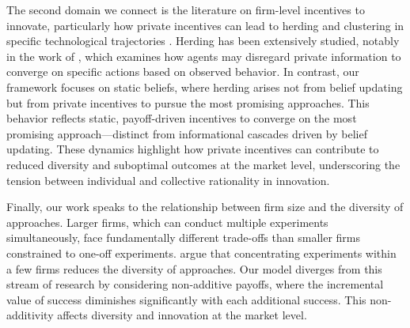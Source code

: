 
The second domain we connect is the literature on firm-level incentives to innovate, particularly how private incentives can lead to herding and clustering in specific technological trajectories \citep{lieberman2006firms, krieger2021trials}. Herding has been extensively studied, notably in the work of \citet{bikhchandani1992theory}, which examines how agents may disregard private information to converge on specific actions based on observed behavior. In contrast, our framework focuses on static beliefs, where herding arises not from belief updating but from private incentives to pursue the most promising approaches. This behavior reflects static, payoff-driven incentives to converge on the most promising approach---distinct from informational cascades driven by belief updating. These dynamics highlight how private incentives can contribute to reduced diversity and suboptimal outcomes at the market level, underscoring the tension between individual and collective rationality in innovation.

Finally,  our work speaks to the relationship between firm size and the diversity of approaches. Larger firms, which can conduct multiple experiments simultaneously, face fundamentally different trade-offs than smaller firms constrained to one-off experiments. \citet{cohen1992tradeoff} argue that concentrating experiments within a few firms reduces the diversity of approaches. Our model diverges from this stream of research by considering non-additive payoffs, where the incremental value of success diminishes significantly with each additional success. This non-additivity affects diversity and innovation at the market level. %




